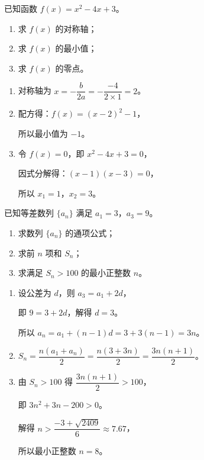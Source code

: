 \documentclass{exam-zh}
\begin{document}
\begin{problem}[points = 15]
  已知函数 $f(x) = x^2 - 4x + 3$。

  \begin{enumerate}
    \item 求 $f(x)$ 的对称轴；
    \item 求 $f(x)$ 的最小值；
    \item 求 $f(x)$ 的零点。
  \end{enumerate}

  \begin{solution}
    \begin{enumerate}
      \item 对称轴为 $x = -\dfrac{b}{2a} = -\dfrac{-4}{2 \times 1} = 2$。

      \item 配方得：$f(x) = (x - 2)^2 - 1$，

      所以最小值为 $-1$。

      \item 令 $f(x) = 0$，即 $x^2 - 4x + 3 = 0$，

      因式分解得：$(x - 1)(x - 3) = 0$，

      所以 $x_1 = 1$，$x_2 = 3$。
    \end{enumerate}
  \end{solution}
\end{problem}

\begin{problem}[points = 20]
  已知等差数列 $\{a_n\}$ 满足 $a_1 = 3$，$a_3 = 9$。

  \begin{enumerate}
    \item 求数列 $\{a_n\}$ 的通项公式；
    \item 求前 $n$ 项和 $S_n$；
    \item 求满足 $S_n > 100$ 的最小正整数 $n$。
  \end{enumerate}

  \begin{solution}
    \begin{enumerate}
      \item 设公差为 $d$，则 $a_3 = a_1 + 2d$，

      即 $9 = 3 + 2d$，解得 $d = 3$。

      所以 $a_n = a_1 + (n - 1)d = 3 + 3(n - 1) = 3n$。

      \item $S_n = \dfrac{n(a_1 + a_n)}{2} = \dfrac{n(3 + 3n)}{2} = \dfrac{3n(n + 1)}{2}$。

      \item 由 $S_n > 100$ 得 $\dfrac{3n(n + 1)}{2} > 100$，

      即 $3n^2 + 3n - 200 > 0$。

      解得 $n > \dfrac{-3 + \sqrt{2409}}{6} \approx 7.67$，

      所以最小正整数 $n = 8$。
    \end{enumerate}
  \end{solution}
\end{problem}
\end{document}
